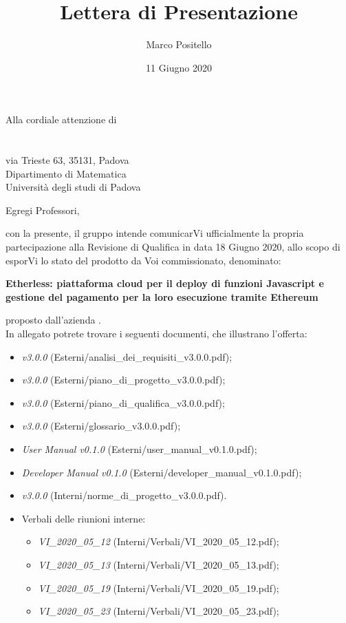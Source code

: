 \documentclass[a4paper]{letter}
\title{Lettera di Presentazione}
\author{Marco Positello}
\begin{document}
\begin{letter} {Alla cordiale attenzione di \\ \TV \\ \RC \\ via Trieste 63, 35131, Padova\\ Dipartimento di Matematica \\ Università degli studi di Padova }
  \vspace*{-0.4\baselineskip}
\date{11 Giugno 2020}
\opening{Egregi Professori,}
con la presente, il gruppo \Gruppo{} intende comunicarVi ufficialmente la propria partecipazione alla Revisione di Qualifica in data 18 Giugno 2020, allo scopo di esporVi lo stato del prodotto da Voi commissionato, denominato:
  \begin{center}
    \textbf{Etherless: piattaforma cloud per il deploy di funzioni Javascript e gestione del pagamento per la loro esecuzione tramite Ethereum}
  \end{center}
  proposto dall'azienda \Proponente.\\
  In allegato potrete trovare i seguenti documenti, che illustrano l'offerta:
  \begin{itemize}
    \item \AdR{} \textit{v3.0.0} (Esterni/analisi\_dei\_requisiti\_v3.0.0.pdf);
    \item \PdP{} \textit{v3.0.0} (Esterni/piano\_di\_progetto\_v3.0.0.pdf);
    \item \PdQ{} \textit{v3.0.0} (Esterni/piano\_di\_qualifica\_v3.0.0.pdf);
    \item \Glossario{} \textit{v3.0.0} (Esterni/glossario\_v3.0.0.pdf);
		\item \textit{User Manual v0.1.0} (Esterni/user\_manual\_v0.1.0.pdf);
		\item \textit{Developer Manual v0.1.0} (Esterni/developer\_manual\_v0.1.0.pdf);
    \item \NdP{} \textit{v3.0.0} (Interni/norme\_di\_progetto\_v3.0.0.pdf).
    \item Verbali delle riunioni interne:
      \begin{itemize}
				\item \textit{VI\_2020\_05\_12} (Interni/Verbali/VI\_2020\_05\_12.pdf);
				\item \textit{VI\_2020\_05\_13} (Interni/Verbali/VI\_2020\_05\_13.pdf);
				\item \textit{VI\_2020\_05\_19} (Interni/Verbali/VI\_2020\_05\_19.pdf);
				\item \textit{VI\_2020\_05\_23} (Interni/Verbali/VI\_2020\_05\_23.pdf);

\end{itemize}
\end{itemize}
\end{letter}
\end{document}
